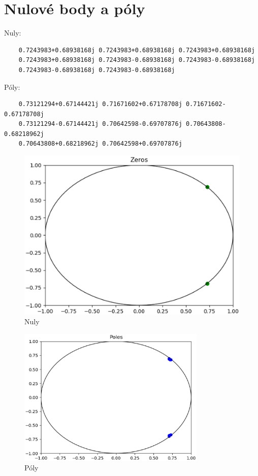 \documentclass{article}
\begin{document}
  \newpage
  \section{Nulové body a póly}

  Nuly:
  \begin{verbatim}
    0.7243983+0.68938168j 0.7243983+0.68938168j 0.7243983+0.68938168j
    0.7243983+0.68938168j 0.7243983-0.68938168j 0.7243983-0.68938168j
    0.7243983-0.68938168j 0.7243983-0.68938168j
  \end{verbatim}
  Póly:
  \begin{verbatim}
    0.73121294+0.67144421j 0.71671602+0.67178708j 0.71671602-0.67178708j
    0.73121294-0.67144421j 0.70642598-0.69707876j 0.70643808-0.68218962j
    0.70643808+0.68218962j 0.70642598+0.69707876j
  \end{verbatim}

  \begin{figure}[H]
    \includegraphics[width=\textwidth]{src/zeros.eps}
    \caption{Nuly}
  \end{figure}
  \begin{figure}[H]
    \centering
    \includegraphics[width=0.8\textwidth]{src/poles.eps}
    \caption{Póly}
  \end{figure}
\end{document}
